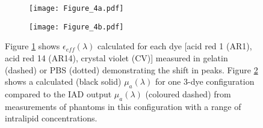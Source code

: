 

\begin{figure}[htbp]
    \centering
    \begin{subfigure}{0.7\textwidth}
        \texttt{[image: Figure\_4a.pdf]}
        \caption{}
        \label{fig:epseff}
    \end{subfigure}
    \begin{subfigure}{0.7\textwidth}
        \texttt{[image: Figure\_4b.pdf]}
        \caption{}
        \label{fig:IADmua}
    \end{subfigure}
    \caption{Figure \ref{fig:epseff} shows $\epsilon_{eff}(\lambda)$ calculated for each dye [acid red 1 (AR1), acid red 14 (AR14), crystal violet (CV)] measured in gelatin (dashed) or PBS (dotted) demonstrating the shift in peaks. Figure \ref{fig:IADmua} shows a calculated (black solid) $\mu_a(\lambda)$ for one 3-dye configuration compared to the IAD output $\mu_a(\lambda)$ (coloured dashed) from measurements of phantoms in this configuration with a range of intralipid concentrations.}
    \label{fig:Phantombackgrounds}
\end{figure}

